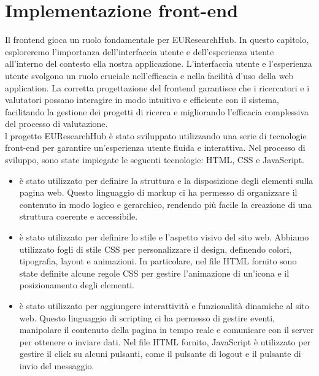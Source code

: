 \documentclass{report}
\begin{document}
\chapter{Implementazione front-end}
Il frontend gioca un ruolo fondamentale per EUResearchHub. In questo capitolo, esploreremo l'importanza dell'interfaccia utente e dell'esperienza utente all'interno del contesto ella nostra applicazione. L'interfaccia utente e l'esperienza utente svolgono un ruolo cruciale nell'efficacia e nella facilità d'uso della web application. La corretta progettazione del frontend garantisce che i ricercatori e i valutatori possano interagire in modo intuitivo e efficiente con il sistema, facilitando la gestione dei progetti di ricerca e migliorando l'efficacia complessiva del processo di valutazione.\\
l progetto EUResearchHub è stato sviluppato utilizzando una serie di tecnologie front-end per garantire un'esperienza utente fluida e interattiva. Nel processo di sviluppo, sono state impiegate le seguenti tecnologie: HTML, CSS e JavaScript.
\begin{itemize}
\item {} è stato utilizzato per definire la struttura e la disposizione degli elementi sulla pagina web. Questo linguaggio di markup ci ha permesso di organizzare il contenuto in modo logico e gerarchico, rendendo più facile la creazione di una struttura coerente e accessibile.

\item {} è stato utilizzato per definire lo stile e l'aspetto visivo del sito web. Abbiamo utilizzato fogli di stile CSS per personalizzare il design, definendo colori, tipografia, layout e animazioni. In particolare, nel file HTML fornito sono state definite alcune regole CSS per gestire l'animazione di un'icona e il posizionamento degli elementi.

\item {} è stato utilizzato per aggiungere interattività e funzionalità dinamiche al sito web. Questo linguaggio di scripting ci ha permesso di gestire eventi, manipolare il contenuto della pagina in tempo reale e comunicare con il server per ottenere o inviare dati. Nel file HTML fornito, JavaScript è utilizzato per gestire il click su alcuni pulsanti, come il pulsante di logout e il pulsante di invio del messaggio.
\end{itemize}
\end{document}
